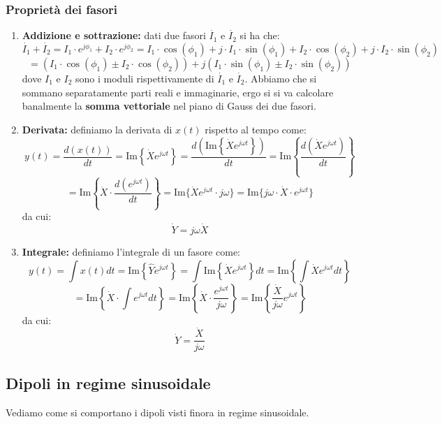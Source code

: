 \documentclass[a4paper,11pt]{article}
\begin{document}
\subsubsection{Proprietà dei fasori}
\begin{enumerate}
	\item \textbf{Addizione e sottrazione:} dati due fasori $\dot{I_1}$ e $\dot{I_2}$ si ha che:
		$$
		\dot{I_1} + \dot{I_2} = I_1 \cdot e^{j\phi_1} + I_2 \cdot e^{j\phi_2} = I_1 \cdot \cos(\phi_1) + j \cdot I_1 \cdot \sin(\phi_1) + I_2 \cdot \cos(\phi_2) + j \cdot I_2 \cdot \sin(\phi_2)
		$$
		$$
		= \left( I_1 \cdot \cos(\phi_1) \pm I_2 \cdot \cos(\phi_2) \right) + j (I_1 \cdot \sin(\phi_1) \pm I_2 \cdot \sin(\phi_2))
		$$
		dove $I_1$ e $I_2$ sono i moduli rispettivamente di $\dot{I_1}$ e $\dot{I_2}$.
		Abbiamo che si sommano separatamente parti reali e immaginarie, ergo si si va calcolare banalmente la \textbf{somma vettoriale} nel piano di Gauss dei due fasori.
	\item \textbf{Derivata:} definiamo la derivata di $x(t)$ rispetto al tempo come:
		$$
		y(t) = \frac{d\left(x(t)\right)}{dt} = \mathrm{Im}\left\{ \dot{X} e^{j \omega t} \right\} = \frac{d\left( \mathrm{Im}\left\{\dot{X}e^{j\omega t}\right\} \right)}{dt} = \mathrm{Im}\left\{ \frac{d\left( \dot{X} e^{j\omega t} \right)}{dt} \right\} 
		$$
		$$
		= \mathrm{Im}\left\{ \dot{X} \cdot \frac{d \left( e^{j \omega t} \right)}{dt} \right\} = \mathrm{Im} \{ \dot{X} e^{j \omega t} \cdot j \omega \} = \mathrm{Im} \{ j\omega \cdot \dot{X} \cdot e^{j\omega t} \}
		$$
		da cui:
		$$
		\dot{Y} = j \omega \dot{X}
		$$
	\item \textbf{Integrale:} definiamo l'integrale di un fasore come:
		$$
		y(t) = \int x(t) dt = \mathrm{Im}\left\{ \hat{Y} e^{j\omega t} \right\} = \int \mathrm{Im} \left\{ \dot{X} e^{j\omega t} \right\} dt = \mathrm{Im} \left\{ \int \dot{X} e^{j \omega t} dt \right\} 
		$$
		$$
		= \mathrm{Im} \left\{ \dot{X} \cdot \int e^{j \omega t} dt \right\} = \mathrm{Im} \left\{ \dot{X} \cdot \frac{e^{j \omega t}}{j\omega} \right\} = \mathrm{Im}\left\{ \frac{\dot{X}}{j\omega} e^{j \omega t} \right\}
		$$
		da cui:
		$$
		\dot{Y} = \frac{\dot{X}}{j\omega}
		$$
\end{enumerate}

\subsection{Dipoli in regime sinusoidale}
Vediamo come si comportano i dipoli visti finora in regime sinusoidale.
\end{document}

